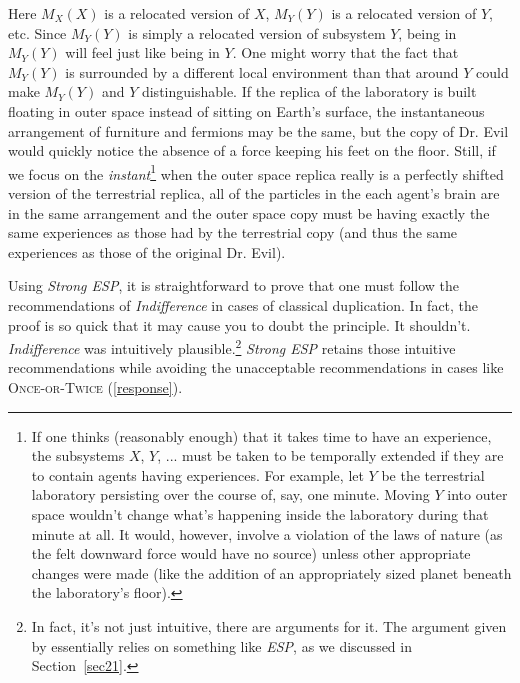 \documentclass[12pt,onecolumn,secnumarabic,amsmath,amssymb,balancelastpage,nofootinbib]{article}
\begin{document}
Here $M_X(X)$ is a {relocated} version of $X$, $M_Y(Y)$ is a {relocated} version of $Y$, etc.  Since $M_Y(Y)$ is simply a {relocated} version of subsystem $Y$, being in $M_Y(Y)$ will feel just like being in $Y$.  One might worry that the fact that $M_Y(Y)$ is surrounded by a different local environment than that around $Y$ could make $M_Y(Y)$ and $Y$ distinguishable.  If the replica of the laboratory is built floating in outer space instead of sitting on Earth's surface, the instantaneous arrangement of furniture and fermions may be the same, but the copy of Dr. Evil would quickly notice the absence of a force keeping his feet on the floor.  Still, if we focus on the \emph{instant}\footnote{If one thinks (reasonably enough) that it takes time to have an experience, the subsystems $X$, $Y$, ... must be taken to be temporally extended if they are to contain agents having experiences.  For example, let $Y$ be the terrestrial laboratory persisting over the course of, say, one minute.  {Moving} $Y$ into outer space wouldn't change what's happening inside the laboratory during that minute at all. It would, however, involve a violation of the laws of nature (as the felt downward force would have no source) unless other appropriate changes were made (like the addition of an appropriately sized planet beneath the laboratory's floor).\label{temporalextension}} when the outer space replica really is a perfectly shifted version of the terrestrial replica, all of the particles in the each agent's brain are in the same arrangement and the outer space copy must be having exactly the same experiences as those had by the terrestrial copy (and thus the same experiences as those of the original Dr. Evil).

Using \emph{Strong ESP}, it is straightforward to prove that one must follow the recommendations of \emph{Indifference} in cases of classical duplication.  In fact, the proof is so quick that it may cause you to doubt the principle.  It shouldn't.  \emph{Indifference} was intuitively plausible.\footnote{In fact, it's not just intuitive, there are arguments for it.  The argument given by \citet{elga2004} essentially relies on something like \emph{ESP}, as we discussed in Section~\ref{sec21}.}  \emph{Strong ESP} retains those intuitive recommendations while avoiding the unacceptable recommendations in cases like \textsc{Once-or-Twice} (\textsection \ref{response}).
\end{document}
